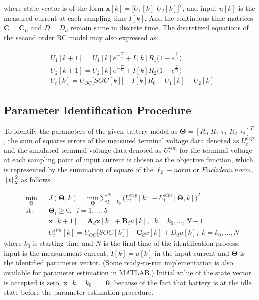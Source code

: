 \documentclass[12pt]{article}
\DeclarePairedDelimiter{\norm}{\lVert}{\rVert}
\begin{document}
\noindent where state vector is of the form $\bm{x}[k] = \big[U_{1}[k]\,\,U_{2}[k]\big]^{T}$, and input $u[k]$ is the measured current at each sampling time $I[k]$. And the continuous time matrices $\bm{C} = \bm{C_{d}}$ and $D=D_{d}$ remain same in discrete time. The discretized equations of the second order RC model may also expressed as:

\begin{align}
	\label{eqn:discrete_state_space_equation_form}
	\begin{split}
		&U_{1}[k+1] = U_{1}[k]e^{-\frac{T}{\tau_{1}}} + I[k] R_{1}\big(1 - e^{\frac{T}{\tau_{1}}}\big) \\
		&U_{2}[k+1] = U_{2}[k]e^{-\frac{T}{\tau_{2}}} + I[k] R_{2}\big(1 - e^{\frac{T}{\tau_{2}}}\big)\\ 
		&U_{t}[k] = U_{OC}\big[SOC[k]\big] - I[k] R_{0} - U_{1}[k] - U_{2}[k]
	\end{split}
\end{align}

\subsection{Parameter Identification Procedure}
To identify the parameters of the given battery model as $\bm{\Theta} = [R_{0}\,\,R_{1}\,\,\tau_{1}\,\,R_{2}\,\,\tau_{2}]^{T}$, the sum of squares
errors of the measured terminal voltage data denoted as $U_{t}^{exp}$ and the simulated terminal voltage data denoted as $U_{t}^{sim}$ for the terminal
voltage at each sampling point of input current is chosen as the objective function, which is represented
by the summation of square of the $\ell_{2}-norm$ or $Euclidean\,norm$, ${\norm x}_{2}^{2}$ as follows:  

\begin{equation} 
	\label{eqn:optimization_problem_formulation}
	\begin{aligned}
		& \underset{\bm{\Theta}}{\text{min}}
		& & \bm{\textit{J}}(\bm{\Theta},k) = \underset{\bm{\Theta}}{\text{min}} \sum_{k=k_{0}}^{N}\bigg(U_{t}^{exp}[k] - U_{t}^{sim}[\bm{\Theta},k]\bigg)^{2} \\
		& \text{st.}
		& & \bm{\Theta}_{i} \geq 0, \;\;i = 1, \dots, 5 \\
		& 
		& & \bm{x}[k+1] = \bm{A}_{d}\bm{x}[k] + \bm{B}_{d}u[k],\;\; k = k_{0},\dots,N-1\\
		& 
		& & U_{t}^{sim}[k] = U_{OC}\big[SOC[k]\big] + \bm{C}_{d}x[k] + D_{d}u[k],\,\, k = k_{0},\dots,N 
	\end{aligned} 
\end{equation}
where $k_{0}$ is starting time and $N$ is the final time of the identification process, input is the measurement current, $I[k]=u[k]$ in the input current and $\bm{\Theta}$ is the identified parameter vector. 
\href{https://www.mathworks.com/videos/automating-the-parameter-estimation-of-a-battery-model-95187.html}{(Some ready-to-run implementation is also available for parameter estimation in MATLAB.)} Initial value of the state vector is accepted is zero, $\bm{x}[k=k_{0}]=\bm{0}$, because of the fact that battery is at the idle state before the parameter estimation procedure. \newline 
\end{document}
